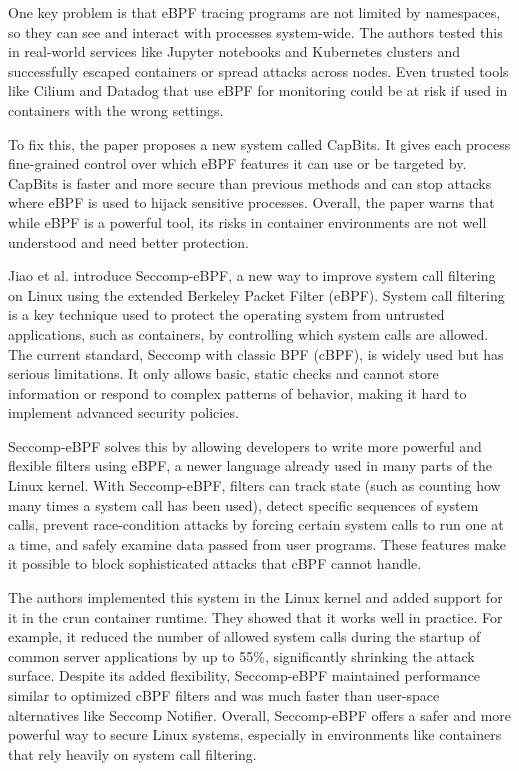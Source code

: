 \begin{doublespace}
One key problem is that eBPF tracing programs are not limited by namespaces, so they can see and interact with processes system-wide. The authors tested this in real-world services like Jupyter notebooks and Kubernetes clusters and successfully escaped containers or spread attacks across nodes. Even trusted tools like Cilium and Datadog that use eBPF for monitoring could be at risk if used in containers with the wrong settings.

To fix this, the paper proposes a new system called CapBits. It gives each process fine-grained control over which eBPF features it can use or be targeted by. CapBits is faster and more secure than previous methods and can stop attacks where eBPF is used to hijack sensitive processes. Overall, the paper warns that while eBPF is a powerful tool, its risks in container environments are not well understood and need better protection.

Jiao et al. \cite{jia2023programmable} introduce Seccomp-eBPF, a new way to improve system call filtering on Linux using the extended Berkeley Packet Filter (eBPF). System call filtering is a key technique used to protect the operating system from untrusted applications, such as containers, by controlling which system calls are allowed. The current standard, Seccomp with classic BPF (cBPF), is widely used but has serious limitations. It only allows basic, static checks and cannot store information or respond to complex patterns of behavior, making it hard to implement advanced security policies.

Seccomp-eBPF solves this by allowing developers to write more powerful and flexible filters using eBPF, a newer language already used in many parts of the Linux kernel. With Seccomp-eBPF, filters can track state (such as counting how many times a system call has been used), detect specific sequences of system calls, prevent race-condition attacks by forcing certain system calls to run one at a time, and safely examine data passed from user programs. These features make it possible to block sophisticated attacks that cBPF cannot handle.

The authors implemented this system in the Linux kernel and added support for it in the crun container runtime. They showed that it works well in practice. For example, it reduced the number of allowed system calls during the startup of common server applications by up to 55\%, significantly shrinking the attack surface. Despite its added flexibility, Seccomp-eBPF maintained performance similar to optimized cBPF filters and was much faster than user-space alternatives like Seccomp Notifier. Overall, Seccomp-eBPF offers a safer and more powerful way to secure Linux systems, especially in environments like containers that rely heavily on system call filtering.


\end{doublespace}
